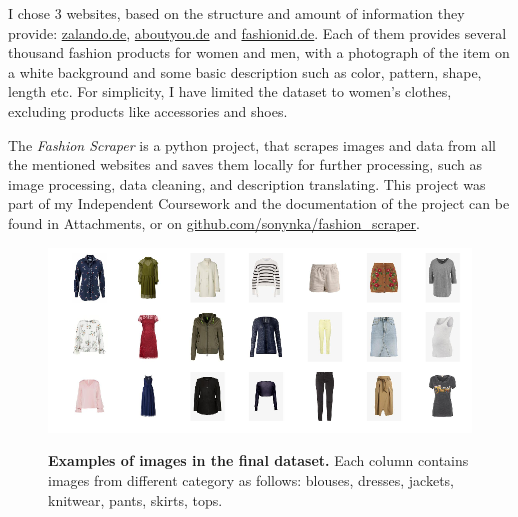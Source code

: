 \documentclass[12pt]{report}
\begin{document}
I chose 3 websites, based on the structure and amount of information they provide: \href{https://www.zalando.de/damen-home/}{zalando.de}, \href{https://www.aboutyou.de/}{aboutyou.de} and \href{https://www.fashionid.de/damen/}{fashionid.de}. Each of them provides several thousand fashion products for women and men, with a photograph of the item on a white background and some basic description such as color, pattern, shape, length etc. For simplicity, I have limited the dataset to women's clothes, excluding products like accessories and shoes.

The \textit{Fashion Scraper} is a python project, that scrapes images and data from all the mentioned websites and saves them locally for further processing, such as image processing, data cleaning, and description translating. This project was part of my Independent Coursework and the documentation of the project can be found in Attachments, or on \href{https://github.com/sonynka/fashion_scraper}{github.com/sonynka/fashion\_scraper}.

\begin{figure}[h]
\centering
{\includegraphics[width=\linewidth]{03_analysis/data/img_grid2}}
\caption{\label{fig:dataset} \textbf{Examples of images in the final dataset.} Each column contains images from different category as follows: blouses, dresses, jackets, knitwear, pants, skirts, tops.}
\end{figure}
\end{document}
